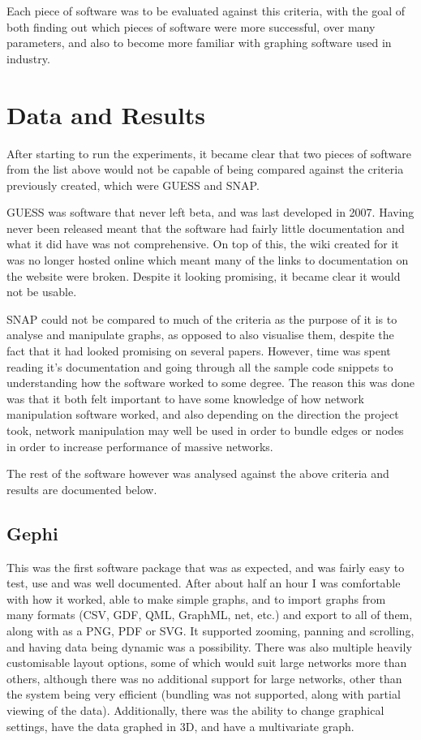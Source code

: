 \documentclass[../dissertation.tex]{subfiles}
\begin{document}
Each piece of software was to be evaluated against this criteria, with the goal of both finding out which pieces of software were more successful, over many parameters, and also to become more familiar with graphing software used in industry.

\section{Data and Results}

After starting to run the experiments, it became clear that two pieces of software from the list above would not be capable of being compared against the criteria previously created, which were GUESS and SNAP.

GUESS was software that never left beta, and was last developed in 2007. Having never been released meant that the software had fairly little documentation and what it did have was not comprehensive. On top of this, the wiki created for it was no longer hosted online which meant many of the links to documentation on the website were broken. Despite it looking promising, it became clear it would not be usable.

SNAP could not be compared to much of the criteria as the purpose of it is to analyse and manipulate graphs, as opposed to also visualise them, despite the fact that it had looked promising on several papers. However, time was spent reading it’s documentation and going through all the sample code snippets to understanding how the software worked to some degree. The reason this was done was that it both felt important to have some knowledge of how network manipulation software worked, and also depending on the direction the project took, network manipulation may well be used in order to bundle edges or nodes in order to increase performance of massive networks.

The rest of the software however was analysed against the above criteria and results are documented below.

\subsection{Gephi}

This was the first software package that was as expected, and was fairly easy to test, use and was well documented. After about half an hour I was comfortable with how it worked, able to make simple graphs, and to import graphs from many formats (CSV, GDF, QML, GraphML, net, etc.) and export to all of them, along with as a PNG, PDF or SVG. It supported zooming, panning and scrolling, and having data being dynamic was a possibility. There was also multiple heavily customisable layout options, some of which would suit large networks more than others, although there was no additional support for large networks, other than the system being very efficient (bundling was not supported, along with partial viewing of the data). Additionally, there was the ability to change graphical settings, have the data graphed in 3D, and have a multivariate graph.
\end{document}
